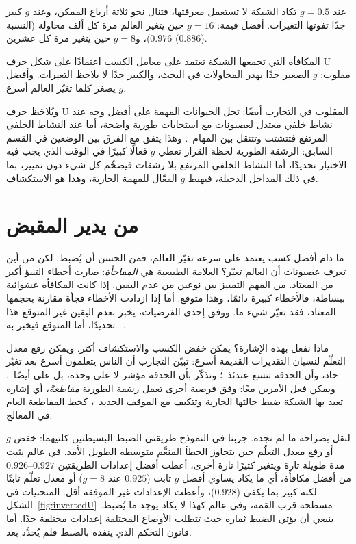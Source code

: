 عند $g=0.5$ تكاد الشبكة لا تستعمل معرفتها، فتنال نحو ثلاثة أرباع الممكن، وعند $g$ كبير جدًا تفوتها التغيرات. أفضل قيمة: $g=16$ حين يتغير العالم مرة كل ألف محاولة (النسبة $0.976$)، و$g=8$ حين يتغير مرة كل عشرين ($0.886$).

\begin{keyblock}
\begin{proposition}
\label{prop:explore}
المكافأة التي تجمعها الشبكة تعتمد على معامل الكسب اعتمادًا على شكل حرف U مقلوب: $g$ الصغير جدًا يهدر المحاولات في البحث، والكبير جدًا لا يلاحظ التغيرات. وأفضل $g$ يصغر كلما تغيّر العالم أسرع.
\end{proposition}
\end{keyblock}

ويُلاحَظ حرف U المقلوب في التجارب أيضًا: تحل الحيوانات المهمة على أفضل وجه عند نشاط خلفي معتدل لعصبونات  مع استجابات طورية واضحة، أما عند النشاط الخلفي المرتفع فتتشتت وتتنقل بين المهام~\cite{AstonJones2005}. وهذا يتفق مع الفرق بين الوضعين في القسم السابق: الرشقة الطورية لحظة القرار تعطي $g$ فعالًا كبيرًا في الوقت الذي يجب فيه الاختيار تحديدًا، أما النشاط الخلفي المرتفع بلا رشقات فيضخّم كل شيء دون تمييز، بما في ذلك المداخل الدخيلة، فيهبط $g$ الفعّال للمهمة الجارية، وهذا هو الاستكشاف.

\section{من يدير المقبض}

ما دام أفضل كسب يعتمد على سرعة تغيّر العالم، فمن الحسن أن يُضبط. لكن من أين تعرف عصبونات  أن العالم تغيّر؟ العلامة الطبيعية هي \emph{المفاجأة}: صارت أخطاء التنبؤ أكبر من المعتاد. من المهم التمييز بين نوعين من عدم اليقين. إذا كانت المكافأة عشوائية ببساطة، فالأخطاء كبيرة دائمًا، وهذا متوقع. أما إذا ازدادت الأخطاء فجأة مقارنة بحجمها المعتاد، فقد تغيّر شيء ما. ووفق إحدى الفرضيات، يخبر  بعدم اليقين غير المتوقع هذا تحديدًا، أما المتوقع فيخبر به ~\cite{YuDayan2005}.

ماذا نفعل بهذه الإشارة؟ يمكن خفض الكسب والاستكشاف أكثر. ويمكن رفع معدل التعلّم لنسيان التقديرات القديمة أسرع: تبيّن التجارب أن الناس يتعلمون أسرع بعد تغيّر حاد، وأن الحدقة تتسع عندئذ~\cite{Nassar2012}؛ ونذكّر بأن الحدقة مؤشر لا على  وحده، بل على  أيضًا~\cite{Reimer2016}. ويمكن فعل الأمرين معًا: وفق فرضية أخرى تعمل رشقة  الطورية \emph{مقاطعةً}، أي إشارة تعيد بها الشبكة ضبط حالتها الجارية وتتكيف مع الموقف الجديد~\cite{BouretSara2005}، كخط المقاطعة العام في المعالج.

لنقل بصراحة ما لم نجده. جربنا في النموذج طريقتي الضبط البسيطتين كلتيهما: خفض $g$ أو رفع معدل التعلّم حين يتجاوز الخطأ المنعَّم متوسطه الطويل الأمد. في عالم يثبت مدة طويلة تارة ويتغير كثيرًا تارة أخرى، أعطت أفضل إعدادات الطريقتين $0.926\text{--}0.927$ من أفضل مكافأة، أي ما يكاد يساوي أفضل $g$ ثابت ($0.925$ عند $g=8$) أو معدل تعلّم ثابتًا لكنه كبير بما يكفي ($0.928$)، وأعطت الإعدادات غير الموفقة أقل. المنحنيات في الشكل~\ref{fig:invertedU} مسطحة قرب القمة، وفي عالم كهذا لا يكاد يوجد ما يُضبط. ينبغي أن يؤتي الضبط ثماره حيث تتطلب الأوضاع المختلفة إعدادات مختلفة جدًا. أما قانون التحكم الذي ينفذه  بالضبط فلم يُحدَّد بعد.

